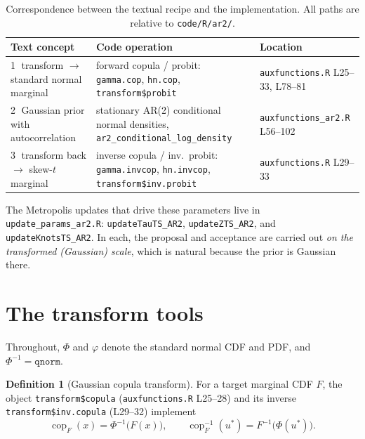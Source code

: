 \documentclass[11pt]{article}
\theoremstyle{definition}
\newtheorem{definition}{Definition}
\newcommand{\Phinv}{\Phi^{-1}}
\newcommand{\code}[1]{\texttt{#1}}
\begin{document}
\begin{table}[h]
\centering
\renewcommand{\arraystretch}{1.3}
\begin{tabular}{p{} p{} p{}}
\toprule
\textbf{Text concept} & \textbf{Code operation} & \textbf{Location} \\
\midrule
\textcircled{1} transform $\to$ standard normal marginal
  & forward copula / probit: \code{gamma.cop}, \code{hn.cop}, \code{transform\$probit}
  & \code{auxfunctions.R} L25--33, L78--81 \\
\textcircled{2} Gaussian prior with autocorrelation
  & stationary AR(2) conditional normal densities, \code{ar2\_conditional\_log\_density}
  & \code{auxfunctions\_ar2.R} L56--102 \\
\textcircled{3} transform back $\to$ skew-$t$ marginal
  & inverse copula / inv.\ probit: \code{gamma.invcop}, \code{hn.invcop}, \code{transform\$inv.probit}
  & \code{auxfunctions.R} L29--33 \\
\bottomrule
\end{tabular}
\caption{Correspondence between the textual recipe and the implementation.
All paths are relative to \code{code/R/ar2/}.}
\label{tab:map}
\end{table}

The Metropolis updates that drive these parameters live in
\code{update\_params\_ar2.R}: \code{updateTauTS\_AR2}, \code{updateZTS\_AR2}, and
\code{updateKnotsTS\_AR2}. In each, the proposal and acceptance are carried out
\emph{on the transformed (Gaussian) scale}, which is natural because the prior is
Gaussian there.

\section{The transform tools}
\label{sec:tools}

Throughout, $\Phi$ and $\varphi$ denote the standard normal CDF and PDF, and
$\Phinv=\code{qnorm}$.

\begin{definition}[Gaussian copula transform]
For a target marginal CDF $F$, the object \code{transform\$copula}
(\code{auxfunctions.R} L25--28) and its inverse \code{transform\$inv.copula}
(L29--32) implement
\begin{equation}
\operatorname{cop}_F(x) = \Phinv\!\big(F(x)\big),
\qquad
\operatorname{cop}_F^{-1}(u^\ast) = F^{-1}\!\big(\Phi(u^\ast)\big).
\label{eq:copula}
\end{equation}
\end{definition}
\end{document}

